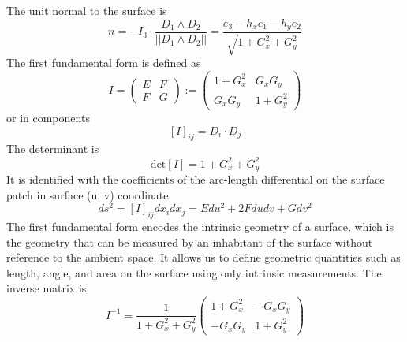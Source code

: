 \documentclass{amsart}
\begin{document}
The unit normal to the surface is
\[
n = -I_3 \cdot \frac{D_1 \wedge D_2} {||D_1 \wedge D_2 ||} = \frac{ e_3 - h_x e_1 - h_y e_2 }{\sqrt{ 1+ G_x^2+ G_y^2}} 
\]
The first fundamental form is defined as
\[
I = \begin{pmatrix}
	E & F \\
	F & G
\end{pmatrix}
:= \begin{pmatrix}
	1+ G_x^2 &  G_x G_y \\
	G_x G_y  &  1+ G_y^2 
\end{pmatrix}
\]
or in components
\[
[I]_{ij} = D_i \cdot D_j
\]
The determinant is
\[
\mathrm{det} [I] = 1 + G_x^2 + G_y^2
\]
It is identified with the coefficients of the arc-length differential on the surface patch in surface (u, v) coordinate
\[
ds^2=  [I]_{ij}dx_i dx_j=  E du^2+ 2 F du dv + G dv^2
\]
The first fundamental form encodes the intrinsic geometry of a surface, which is the geometry that can be measured by an inhabitant of the surface without reference to the ambient space.
It allows us to define geometric quantities such as length, angle, and area on the surface using only intrinsic measurements.
The inverse matrix is 
\[
I^{-1} = \frac{1}{1 + G_x^2 + G_y^2} \begin{pmatrix}
	1+ G_x^2 &  -G_x G_y \\
	-G_x G_y  &  1+ G_y^2 
\end{pmatrix}
\]
\end{document}
